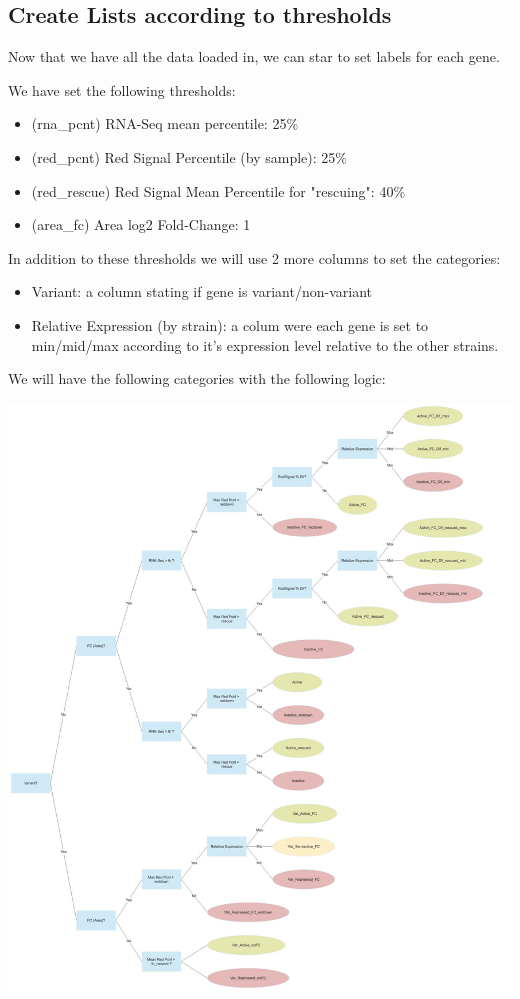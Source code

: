 \documentclass[11pt]{article}
\begin{document}
\subsection{Create Lists according to thresholds}
\label{sec:org488119a}

Now that we have all the data loaded in, we can star to set labels for each gene.

We have set the following thresholds:
\begin{itemize}
\item (rna\_pcnt) RNA-Seq mean percentile: 25\%
\item (red\_pcnt) Red Signal Percentile (by sample): 25\%
\item (red\_rescue) Red Signal Mean Percentile for "rescuing": 40\%
\item (area\_fc) Area log2 Fold-Change: 1
\end{itemize}

In addition to these thresholds we will use 2 more columns to set the categories:
\begin{itemize}
\item Variant: a column stating if gene is variant/non-variant
\item Relative Expression (by strain): a colum were each gene is set to min/mid/max according to it's expression level relative to the other strains.
\end{itemize}

We will have the following categories with the following logic:

\begin{center}
\includegraphics[width=.9\linewidth]{./Plots/active_genes_tree.jpg}
\end{center}
\end{document}
